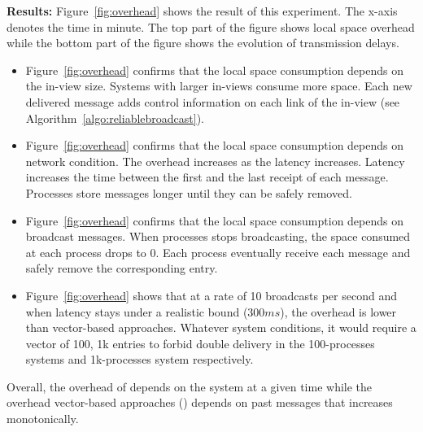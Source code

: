\noindent \textbf{Results:} Figure~\ref{fig:overhead} shows the result of this
experiment. The x-axis denotes the time in minute. The top part of the figure
shows local space overhead while the bottom part of the figure shows the
evolution of transmission delays.
\begin{itemize}
\item Figure~\ref{fig:overhead} confirms that the local space consumption
  depends on the in-view size. Systems with larger in-views consume more
  space. Each new delivered message adds control information on each link of the
  in-view (see Algorithm~\ref{algo:reliablebroadcast}).
\item Figure~\ref{fig:overhead} confirms that the local space consumption
  depends on network condition. The overhead increases as the latency
  increases. Latency increases the time between the first and the last receipt
  of each message. Processes store messages longer until they can be safely
  removed.
\item Figure~\ref{fig:overhead} confirms that the local space consumption
  depends on broadcast messages. When processes stops broadcasting, the space
  consumed at each process drops to 0. Each process eventually receive each
  message and safely remove the corresponding entry.
\item Figure~\ref{fig:overhead} shows that at a rate of 10 broadcasts per second
  and when latency stays under a realistic bound ($300ms$), the overhead is
  lower than vector-based approaches. Whatever system conditions, it would
  require a vector of 100, 1k entries to forbid double delivery in the
  100-processes systems and 1k-processes system respectively.
\end{itemize}

\noindent Overall, the overhead of \PCBROADCAST depends on the system at a given
time while the overhead vector-based approaches (\REF) depends on past messages
that increases monotonically. 




